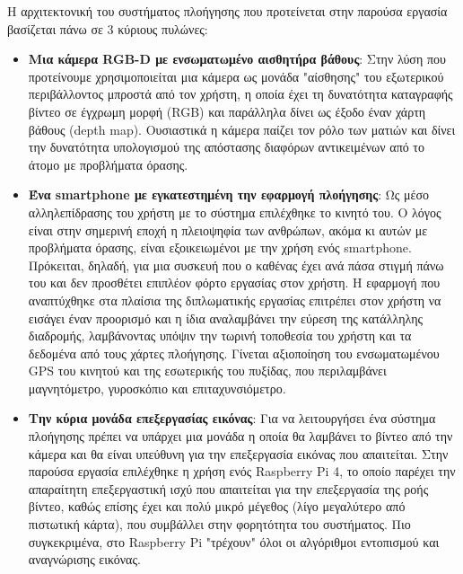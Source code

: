 Η αρχιτεκτονική του συστήματος πλοήγησης που προτείνεται στην παρούσα εργασία βασίζεται πάνω σε 3 κύριους πυλώνες:
\begin{itemize}
    \item \textbf{Μια κάμερα RGB-D με ενσωματωμένο αισθητήρα βάθους}: Στην λύση που προτείνουμε χρησιμοποιείται μια κάμερα ως μονάδα "αίσθησης" του εξωτερικού περιβάλλοντος μπροστά από τον χρήστη, η οποία έχει τη δυνατότητα καταγραφής βίντεο σε έγχρωμη μορφή (RGB) και παράλληλα δίνει ως έξοδο έναν χάρτη βάθους (depth map). Ουσιαστικά η κάμερα παίζει τον ρόλο των ματιών και δίνει την δυνατότητα υπολογισμού της απόστασης διαφόρων αντικειμένων από το άτομο με προβλήματα όρασης.
    \item \textbf{Ένα smartphone με εγκατεστημένη την εφαρμογή πλοήγησης}: Ως μέσο αλληλεπίδρασης του χρήστη με το σύστημα επιλέχθηκε το κινητό του. Ο λόγος είναι στην σημερινή εποχή η πλειοψηφία των ανθρώπων, ακόμα κι αυτών με προβλήματα όρασης, είναι εξοικειωμένοι με την χρήση ενός smartphone. Πρόκειται, δηλαδή, για μια συσκευή που ο καθένας έχει ανά πάσα στιγμή πάνω του και δεν προσθέτει επιπλέον φόρτο εργασίας στον χρήστη. Η εφαρμογή που αναπτύχθηκε στα πλαίσια της διπλωματικής εργασίας επιτρέπει στον χρήστη να εισάγει έναν προορισμό και η ίδια αναλαμβάνει την εύρεση της κατάλληλης διαδρομής, λαμβάνοντας υπόψιν την τωρινή τοποθεσία του χρήστη και τα δεδομένα από τους χάρτες πλοήγησης. Γίνεται αξιοποίηση του ενσωματωμένου GPS του κινητού και της εσωτερικής του πυξίδας, που περιλαμβάνει μαγνητόμετρο, γυροσκόπιο και επιταχυνσιόμετρο.
    \item \textbf{Την κύρια μονάδα επεξεργασίας εικόνας}: Για να λειτουργήσει ένα σύστημα πλοήγησης πρέπει να υπάρχει μια μονάδα η οποία θα λαμβάνει το βίντεο από την κάμερα και θα είναι υπεύθυνη για την επεξεργασία εικόνας που απαιτείται. Στην παρούσα εργασία επιλέχθηκε η χρήση ενός Raspberry Pi 4, το οποίο παρέχει την απαραίτητη επεξεργαστική ισχύ που απαιτείται για την επεξεργασία της ροής βίντεο, καθώς επίσης έχει και πολύ μικρό μέγεθος (λίγο μεγαλύτερο από πιστωτική κάρτα), που συμβάλλει στην φορητότητα του συστήματος. Πιο συγκεκριμένα, στο Raspberry Pi "τρέχουν" όλοι οι αλγόριθμοι εντοπισμού και αναγνώρισης εικόνας.
\end{itemize}

